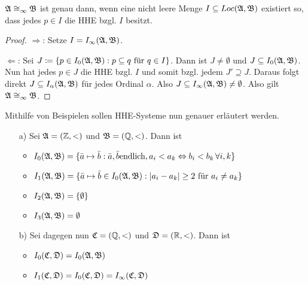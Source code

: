\begin{lemma}
	$\mathfrak{A}\cong_\infty\mathfrak{B}$ ist genau dann, wenn eine nicht leere Menge $I\subseteq Loc(\mathfrak{A},\mathfrak{B})$ existiert so, dass jedes $p\in I$ die HHE bzgl. $I$ besitzt.
\end{lemma}
\begin{proof}
	$\Rightarrow$: Setze $I=I_\infty(\mathfrak{A},\mathfrak{B})$.
	
	$\Leftarrow$: Sei $J\coloneqq\{p\in I_0(\mathfrak{A},\mathfrak{B}) : p\subseteq q \text{ für } q\in I\}$. Dann ist $J\neq\emptyset$ und $J\subseteq I_0(\mathfrak{A},\mathfrak{B})$. Nun hat jedes $p\in J$ die HHE bzgl. $I$ und somit bzgl. jedem $J'\supseteq J$. Daraus folgt direkt $J\subseteq I_\alpha(\mathfrak{A},\mathfrak{B})$ für jedes Ordinal $\alpha$. Also $J\subseteq I_\infty(\mathfrak{A},\mathfrak{B})\neq \emptyset$. Also gilt $\mathfrak{A}\cong_\infty\mathfrak{B}$.
\end{proof}

Mithilfe von Beispielen sollen HHE-Systeme nun genauer erläutert werden.
\begin{itemize}
	\item[a)] Sei $\mathfrak{A}=(\mathbb{Z}, <)$ und $\mathfrak{B}=(\mathbb{Q},<)$. Dann ist
	\begin{itemize}
		\item $I_0(\mathfrak{A},\mathfrak{B})=\{\bar{a}\mapsto \bar{b} : \bar{a},\bar{b} \text{endlich}, a_i<a_k \Leftrightarrow b_i<b_k \, \forall i,k\}$
		\item $I_1(\mathfrak{A},\mathfrak{B})=\{\bar{a}\mapsto\bar{b} \in I_0(\mathfrak{A},\mathfrak{B}) : \vert a_i-a_k\vert \geq 2 \text{ für } a_i\neq a_k\}$
		\item $I_2(\mathfrak{A},\mathfrak{B})=\{\emptyset\}$
		\item $I_3(\mathfrak{A},\mathfrak{B})=\emptyset$
	\end{itemize}
	
	\item[b)] Sei dagegen nun $\mathfrak{C}=(\mathbb{Q},<)$ und $\mathfrak{D}=(\mathbb{R},<)$. Dann ist
	\begin{itemize}
		\item $I_0(\mathfrak{C},\mathfrak{D})=I_0(\mathfrak{A},\mathfrak{B})$
		\item $I_1(\mathfrak{C},\mathfrak{D})=I_0(\mathfrak{C},\mathfrak{D})=I_\infty(\mathfrak{C},\mathfrak{D})$
	\end{itemize}
\end{itemize}

